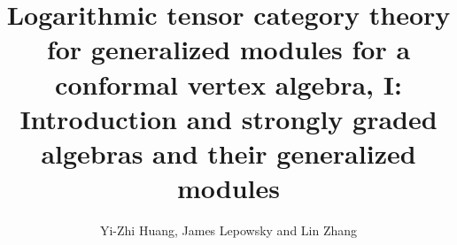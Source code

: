 \documentclass[12pt]{article}
\title{{\bf Logarithmic
tensor category theory for generalized modules for a conformal
vertex algebra, I: Introduction and strongly graded
algebras and their generalized modules}}
\author{Yi-Zhi Huang, James Lepowsky and Lin Zhang}
\date{}
\begin{document}
    
    \maketitle

%    
%    
    \newtheorem{rema}{Remark}[section]
    \newtheorem{propo}[rema]{Proposition}
    \newtheorem{theo}[rema]{Theorem}
   \newtheorem{defi}[rema]{Definition}
    \newtheorem{lemma}[rema]{Lemma}
    \newtheorem{corol}[rema]{Corollary}
     \newtheorem{exam}[rema]{Example}
\newtheorem{assum}[rema]{Assumption}
     \newtheorem{nota}[rema]{Notation}
        \newcommand{\ba}{\begin{array}}
        \newcommand{\ea}{\end{array}}
        \newcommand{\be}{\begin{equation}}
        \newcommand{\ee}{\end{equation}}
        \newcommand{\bea}{\begin{eqnarray}}
        \newcommand{\eea}{\end{eqnarray}}
        \newcommand{\nno}{\nonumber}
        \newcommand{\nn}{\nonumber\\}
        \newcommand{\lbar}{\bigg\vert}
        \newcommand{\p}{\partial}
        \newcommand{\dps}{\displaystyle}
        \newcommand{\bra}{\langle}
        \newcommand{\ket}{\rangle}
 \newcommand{\res}{\mbox{\rm Res}}
\newcommand{\wt}{\mbox{\rm wt}\;}
\newcommand{\swt}{\mbox{\scriptsize\rm wt}\;}
 \newcommand{\pf}{{\it Proof}\hspace{2ex}}
 \newcommand{\epf}{\hspace{2em}$\square$}
 \newcommand{\epfv}{\hspace{1em}$\square$\vspace{1em}}
        \newcommand{\ob}{{\rm ob}\,}
        \renewcommand{\hom}{{\rm Hom}}
\newcommand{\C}{\mathbb{C}}
\newcommand{\R}{\mathbb{R}}
\newcommand{\Z}{\mathbb{Z}}
\newcommand{\N}{\mathbb{N}}
\newcommand{\A}{\mathcal{A}}
\newcommand{\Y}{\mathcal{Y}}
\newcommand{\Arg}{\mbox{\rm Arg}\;}
\newcommand{\comp}{\mathrm{COMP}}
\newcommand{\lgr}{\mathrm{LGR}}



\newcommand{\dlt}[3]{#1 ^{-1}\delta \bigg( \frac{#2 #3 }{#1 }\bigg) }

\newcommand{\dlti}[3]{#1 \delta \bigg( \frac{#2 #3 }{#1 ^{-1}}\bigg) }
\end{document}
